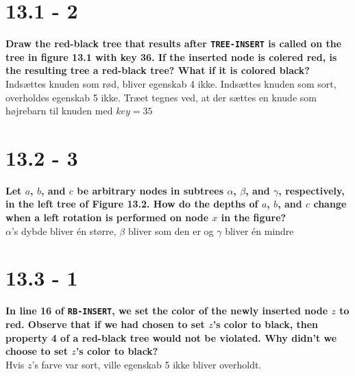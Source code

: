 \documentclass{report}
\begin{document}
\section*{13.1 - 2}
\textbf{Draw the red-black tree that results after \texttt{TREE-INSERT} is called on the tree in figure 13.1 with key 36. If the inserted node is colered red, is the resulting tree a red-black tree? What if it is colored black?}
Indsættes knuden som rød, bliver egenskab 4 ikke. Indsættes knuden som sort, overholdes egenskab 5 ikke. Træet tegnes ved, at der sættes en knude som højrebarn til knuden med $key = 35$

\section*{13.2 - 3}
\textbf{Let $a$, $b$, and $c$ be arbitrary nodes in subtrees $\alpha$, $\beta$, and $\gamma$, respectively, in the left tree of Figure 13.2. How do the depths of $a$, $b$, and $c$ change when a left rotation is performed on node $x$ in the figure?} \\
$\alpha$'s dybde bliver én større, $\beta$ bliver som den er og $\gamma$ bliver én mindre 

\section*{13.3 - 1}
\textbf{In line 16 of \texttt{RB-INSERT}, we set the color of the newly inserted node $z$ to red. Observe that if we had chosen to set $z$'s color to black, then property 4 of a red-black tree would not be violated. Why didn't we choose to set $z$'s color to black?} \\
Hvis $z$'s farve var sort, ville egenskab 5 ikke bliver overholdt.
\end{document}
